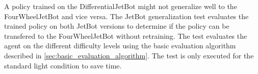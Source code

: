 A policy trained on the DifferentialJetBot might not generalize well to the FourWheelJetBot and vice versa. The JetBot generalization test evaluates the trained policy on both JetBot versions to determine if the policy can be transfered to the FourWheelJetBot without retraining. The test evaluates the agent on the different difficulty levels using the basic evaluation algorithm described in \ref{sec:basic_evaluation_algorithm}. The test is only executed for the standard light condition to save time.



